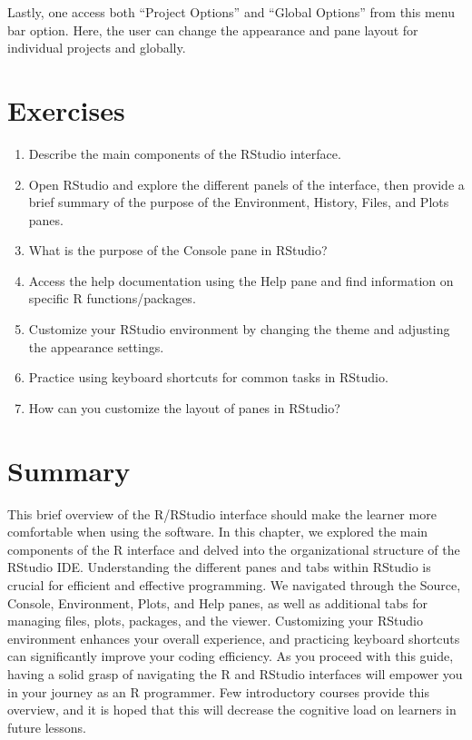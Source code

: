 \documentclass[
  letterpaper,
  DIV=11,
  numbers=noendperiod]{scrreprt}
\providecommand{\tightlist}{%
  \setlength{\itemsep}{0pt}\setlength{\parskip}{0pt}}\usepackage{longtable,booktabs,array}
\begin{document}
Lastly, one access both ``Project Options'' and ``Global Options'' from
this menu bar option. Here, the user can change the appearance and pane
layout for individual projects and globally.

\section{Exercises}\label{exercises-2}

\begin{enumerate}
\def\labelenumi{\roman{enumi}.}
\tightlist
\item
  Describe the main components of the RStudio interface.
\item
  Open RStudio and explore the different panels of the interface, then
  provide a brief summary of the purpose of the Environment, History,
  Files, and Plots panes.
\item
  What is the purpose of the Console pane in RStudio?
\item
  Access the help documentation using the Help pane and find information
  on specific R functions/packages.
\item
  Customize your RStudio environment by changing the theme and adjusting
  the appearance settings.
\item
  Practice using keyboard shortcuts for common tasks in RStudio.
\item
  How can you customize the layout of panes in RStudio?
\end{enumerate}

\section{Summary}\label{summary-2}

This brief overview of the R/RStudio interface should make the learner
more comfortable when using the software. In this chapter, we explored
the main components of the R interface and delved into the
organizational structure of the RStudio IDE. Understanding the different
panes and tabs within RStudio is crucial for efficient and effective
programming. We navigated through the Source, Console, Environment,
Plots, and Help panes, as well as additional tabs for managing files,
plots, packages, and the viewer. Customizing your RStudio environment
enhances your overall experience, and practicing keyboard shortcuts can
significantly improve your coding efficiency. As you proceed with this
guide, having a solid grasp of navigating the R and RStudio interfaces
will empower you in your journey as an R programmer. Few introductory
courses provide this overview, and it is hoped that this will decrease
the cognitive load on learners in future lessons.
\end{document}
